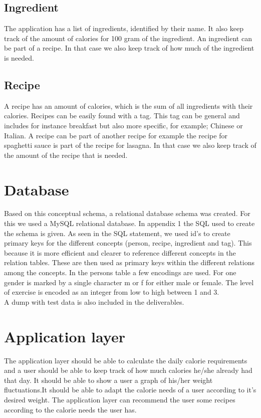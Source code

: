 \documentclass{article}
\begin{document}
\subsection{Ingredient}
The application has a list of ingredients, identified by their name. It also keep track of the amount of calories for 100 gram of the ingredient. An ingredient can be part of a recipe. In that case we also keep track of how much of the ingredient is needed.

\subsection{Recipe}
 A recipe has an amount of calories, which is the sum of all ingredients with their calories. Recipes can be easily found with a tag. This tag can be general and includes for instance breakfast but also more specific, for example; Chinese or Italian. A recipe can be part of another recipe for example the recipe for spaghetti sauce is part of the recipe for lasagna. In that case we also keep track of the amount of the recipe that is needed.   


\section{Database}
Based on this conceptual schema, a relational database schema was created. For this we used a MySQL relational database. In appendix 1 the SQL used to create the schema is given. As seen in the SQL statement, we used id's to create primary keys for the different concepts (person, recipe, ingredient and tag). This because it is more efficient and clearer to reference different concepts in the relation tables. These are then used as primary keys within the different relations among the concepts. In the persons table a few encodings are used. For one gender is marked by a single character m or f for either male or female. The level of exercise is encoded as an integer from low to high between 1 and 3.\\
A dump with test data is also included in the deliverables. 

\section{Application layer}
The application layer should be able to calculate the daily calorie requirements and a user should be able to keep track of how much calories he/she already had that day. It should be able to show a user a graph of his/her weight fluctuations.It should be able to adapt the calorie needs of a user according to it's desired weight. The application layer can recommend the user some recipes according to the calorie needs the user has.
\end{document}
